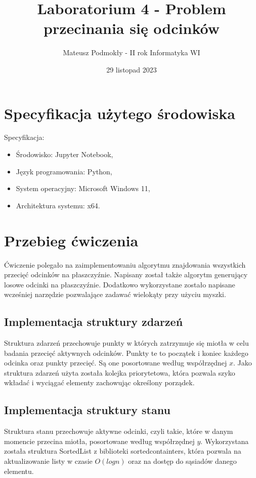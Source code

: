 \documentclass[11pt]{scrartcl}
\title{Laboratorium 4 - Problem przecinania się odcinków}
\author{Mateusz Podmokły - II rok Informatyka WI}
\date{29 listopad 2023}
\begin{document}
    \maketitle
    \section{Specyfikacja użytego środowiska}
    Specyfikacja:

    \begin{itemize}
        \item Środowisko: Jupyter Notebook,
        \item Język programowania: Python,
        \item System operacyjny: Microsoft Windows 11,
        \item Architektura systemu: x64.
    \end{itemize}

    \section{Przebieg ćwiczenia}
    Ćwiczenie polegało na zaimplementowaniu algorytmu znajdowania wszystkich przecięć
    odcinków na płaszczyźnie. Napisany został także algorytm generujący losowe odcinki
    na płaszczyźnie. Dodatkowo wykorzystane zostało napisane wcześniej narzędzie
    pozwalające zadawać wielokąty przy użyciu myszki.

    \subsection{Implementacja struktury zdarzeń}
    Struktura zdarzeń przechowuje punkty w których zatrzymuje się miotła w celu
    badania przecięć aktywnych odcinków. Punkty te to początek i koniec każdego
    odcinka oraz punkty przecięć. Są one posortowane według współrzędnej $x$.
    Jako struktura zdarzeń użyta została kolejka priorytetowa, która pozwala szyko
    wkładać i wyciągać elementy zachowując określony porządek.

    \subsection{Implementacja struktury stanu}
    Struktura stanu przechowuje aktywne odcinki, czyli takie, które w danym momencie
    przecina miotła, posortowane według współrzędnej $y$. Wykorzystana została
    struktura SortedList z biblioteki sortedcontainters, która pozwala na
    aktualizowanie listy w czasie $O(logn)$ oraz na dostęp do sąsiadów danego
    elementu.
\end{document}
